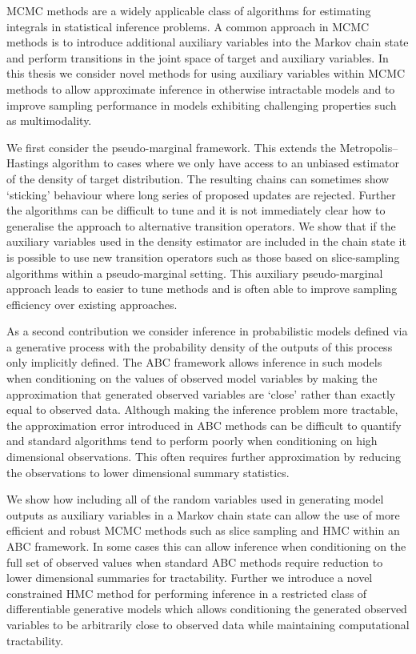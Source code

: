 
\ac{MCMC} methods are a widely applicable class of algorithms for estimating integrals in statistical inference problems. A common approach in \ac{MCMC} methods is to introduce additional auxiliary variables into the Markov chain state and perform transitions in the joint space of target and auxiliary variables. In this thesis we consider novel methods for using auxiliary variables within \ac{MCMC} methods to allow approximate inference in otherwise intractable models and to improve sampling performance in models exhibiting challenging properties such as multimodality.

We first consider the pseudo-marginal framework. This extends the Metropolis–Hastings algorithm to cases where we only have access to an unbiased estimator of the density of target distribution. The resulting chains can sometimes show ‘sticking’ behaviour where long series of proposed updates are rejected. Further the algorithms can be difficult to tune and it is not immediately clear how to generalise the approach to alternative transition operators. We show that if the auxiliary variables used in the density estimator are included in the chain state it is possible to use new transition operators such as those based on slice-sampling algorithms within a pseudo-marginal setting. This auxiliary pseudo-marginal approach leads to easier to tune methods and is often able to improve sampling efficiency over existing approaches.

As a second contribution we consider inference in probabilistic models defined via a generative process with the probability density of the outputs of this process only implicitly defined. The \ac{ABC} framework allows inference in such models when conditioning on the values of observed model variables by making the approximation that generated observed variables are ‘close’ rather than exactly equal to observed data. Although making the inference problem more tractable, the approximation error introduced in \ac{ABC} methods can be difficult to quantify and standard algorithms tend to perform poorly when conditioning on high dimensional observations. This often requires further approximation by reducing the observations to lower dimensional summary statistics.

We show how including all of the random variables used in generating model outputs as auxiliary variables in a Markov chain state can allow the use of more efficient and robust \ac{MCMC} methods such as slice sampling and \ac{HMC} within an \ac{ABC} framework. In some cases this can allow inference when conditioning on the full set of observed values when standard \ac{ABC} methods require reduction to lower dimensional summaries for tractability. Further we introduce a novel constrained \ac{HMC} method for performing inference in a restricted class of differentiable generative models which allows conditioning the generated observed variables to be arbitrarily close to observed data while maintaining computational tractability.

